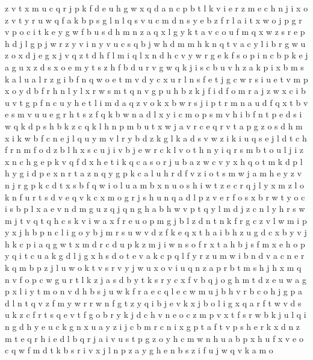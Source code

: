 \documentclass{article}
\begin{document}
z v t x m u c q r j p k f d e
u h g w x q d a n c p b t l k v i e r z
m e c h n j i x o z v t y r u w q f a k b p s g l
n l q s v
u c m d n s y e b z f r l a i t x w o j p g
r v p o c i t k e y g w f b u s d h m n z a q x l
g y k t a v c o u f m q x w z s r e p h d j l
g p j w r z y v
i
n y v u c s q b
j w h d m
m h k n q t v a c y l i b r g w u z o x d j e
g x j v q z t d h f l
m i q l x n d h c v y w r g e k f s o p
i n c b p k e j a g u x z d s
x o e m y t s z h f b d u r v g w q k j i
s c b u v h z a k p i x
b m s k a l u
a l r z g i b f n q w o e t m v d y c x u
r l n s f e t
j g c w r s i u e t v m p x o y d b f
r h
n l
y l x r w s m t q n v g p u h b z k j f i
d f o m r a j z w x c i b u v t g
p f n c u y h e t l i m d a q z v o k x b w r s j
i p t r
m n a u d f q x t b v e
s m v u
u e g r h t s z f q k b w n a d l x y i c m o p
s m v h i
b f n t p e d s i w
q k d p s h
b k z c q
k l h n p m b u t x w j a v r c e q
r v t a p g z o s d h m x i k w b f c n e j l q u y
m v l r y b d z k
g l k a d s v w z i
k i u q s e j l d t c h f
r n m f o d z b l h x s c u j i v
b j e w r c k l v o t h n y i q
r s m b t o u l j i z x n c h g e p k v q f
d x h e t i k q c a s o
r j u b a z w c v y x h q o t m k d p l
h y g i d p e x n r t a z
n q y g p k c a l u h r d f v z i o t s m w j
a m h e y z v n j r g p k c d t x s b f q w i o l u
a m b x n u o s h i w t z e c r q j l
y x m z l o k n f u r t s d v e q
v k c x m o g r j s h u n q a d
l p z v e r f o s x b
r w t y o c i s b p l x a e v n d m g u z q j
q n g h
a b h w v p t q y l m d j
z c n l y h r s w m j t v q
t q h c s k v i w a x f r e u o p m g j b l z d n
t n k f r g c z v l w m i p y x j h b
p n c l i g o y b j m r s u w v d z f k e q x t h a
i b h z u g d c x
b y v j h k c p i a q g w t x m d r
c d u p k z m j i w n s o f r x t a h
b j s f m x e h o p y q i t c u a k g d l
j g x h s d o t e v a k c p q l f y r z u m w i b n
d v a c n e r k q m b p z j l
u w o k t v
s r v y j w u
x o v i u q n z a p r b t m s h j
h x m q n v f o p c w g u r t l k z j a s d b y
t
k s r y c x f v b q j o g h m t d z e u w a
g p x l i y t m o n v d h b s j u w k f r a e c q
l e c w m u j b h v r
b c o h j g p a d l n t q v z f m y w r
r w n f g t z y q i b j e v k x
j b o l i g x q a r f t w v d s u k z
c f r t s q e v
t f
g o b r y k j d c h v n e
o c z m p v x t f s r w b k j u l q i n g d h y e
u c k
g n x u a y z i j c b m
r c n i x g p t
a f t v p s h e r k x d n z
m t
e q r h i
e d l b q r j a i v u s t p g z o y h c m w n
h u a b p x
h u f x v e
o c q w f m d t k b s r i v x j l n p z a y g h e
n b s z i f u j w q v k a m o
\end{document}
